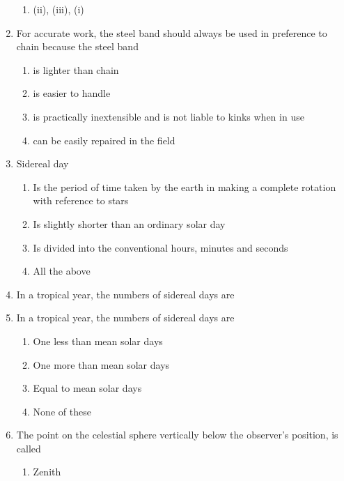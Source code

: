 \documentclass[11pt,a4paper]{article}
\begin{document}
\begin{enumerate}
\begin{enumerate}[label=\Alph*.]
\item{(ii), (iii), (i)}
\end{enumerate}
\item{For accurate work, the steel band should always be used in preference to chain because the steel band}
\begin{enumerate}[label=\Alph*.]
\item{is lighter than chain}
\item{is easier to handle}
\item{is practically inextensible and is not liable to kinks when in use}
\item{can be easily repaired in the field}
\end{enumerate}
\item{Sidereal day}
\begin{enumerate}[label=\Alph*.]
\item{Is the period of time taken by the earth in making a complete rotation with reference to stars}
\item{Is slightly shorter than an ordinary solar day}
\item{Is divided into the conventional hours, minutes and seconds}
\item{All the above}
\end{enumerate}
\item{In a tropical year, the numbers of sidereal days are}
\\
\item{In a tropical year, the numbers of sidereal days are}
\begin{enumerate}[label=\Alph*.]
\item{One less than mean solar days}
\item{One more than mean solar days}
\item{Equal to mean solar days}
\item{None of these}
\end{enumerate}
\item{The point on the celestial sphere vertically below the observer's position, is called}
\begin{enumerate}[label=\Alph*.]
\item{Zenith}

\end{enumerate}
\end{enumerate}
\end{document}
